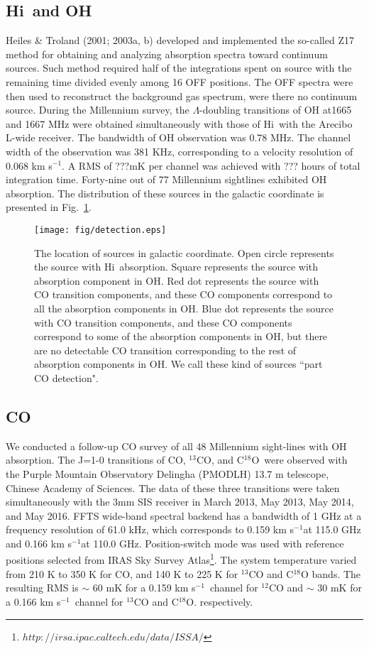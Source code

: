 \documentclass[preprint]{emulateapj}
\def\hi{H{\sc i}}
\def\kms{km s$^{-1}$}
\def\13co{$^{13}$CO}
\def\c18o{C$^{18}$O}
\begin{document}
\subsection{\hi\ and OH}
\label{subsec:oh}
Heiles \& Troland (2001; 2003a, b) developed and implemented the so-called  Z17 method for obtaining and analyzing absorption spectra toward continuum sources. Such method required half of the integrations spent on source with the remaining time divided evenly among 16 OFF positions. The OFF  spectra were then used to reconstruct the background gas spectrum, were there no continuum source. 
During the Millennium survey, the $\Lambda$-doubling transitions of OH at1665 and 1667 MHz  were obtained simultaneously with those of \hi\ with the Arecibo L-wide receiver. 
The bandwidth of OH observation was 0.78 MHz. The channel width of the observation was 381 KHz, corresponding to a velocity resolution of 0.068 \kms. A RMS of ???mK per channel was achieved with ??? hours of total integration time. Forty-nine out of 77 Millennium sightlines exhibited OH absorption. The distribution of these sources in the galactic coordinate is presented in Fig.~\ref{fig:posdistri}. 
\begin{figure}
\texttt{[image: fig/detection.eps]}
\caption{The location of sources in galactic coordinate. Open circle represents the source with \hi\ absorption. Square represents the source with absorption component in OH.  Red dot represents the source with CO transition components, and these CO components correspond to all the absorption components in OH. Blue dot represents the source with CO transition components, and these CO components correspond to some of the absorption components in OH, but there are no detectable CO transition corresponding to the rest of absorption components in OH. We call these kind of sources ``part CO detection".  }
\label{fig:posdistri} 
\end{figure}

\subsection{CO}
\label{subsec:CO}
	We conducted a follow-up CO survey of all 48 Millennium sight-lines with OH absorption.  The J=1-0 transitions of CO, \13co, and \c18o\ were observed with the Purple Mountain Observatory Delingha (PMODLH) 13.7 m telescope, Chinese Academy of Sciences. The data of these three transitions were taken simultaneously  with the 3mm SIS receiver in March 2013, May 2013, May 2014, and May 2016. FFTS wide-band spectral backend has a bandwidth of 1 GHz at a frequency resolution of 61.0 kHz, which corresponds to 0.159 \kms at 115.0 GHz and  0.166 \kms at 110.0 GHz. Position-switch mode was  used with reference positions selected from IRAS Sky Survey Atlas\footnote{$http://irsa.ipac.caltech.edu/data/ISSA/$}.  The system temperature varied from 210 K to 350 K for CO, and 140 K  to 225 K for  \13co and \c18o bands. The resulting RMS is $\sim$ 60 mK for a 0.159 \kms\  channel for $^{12}$CO and $\sim$ 30 mK for a 0.166 \kms\  channel for $^{13}$CO and C$^{18}$O. respectively.    
	
\end{document}
